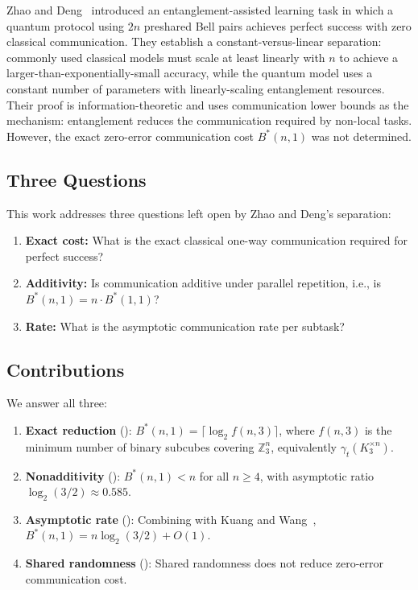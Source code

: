 \documentclass[11pt,letterpaper]{article}
\newcommand{\Z}{\mathbb{Z}}
\newcommand{\gammat}{\gamma_t}
\newcommand{\Bstar}{B^{\!*}}
\begin{document}
Zhao and Deng~\cite{zhaodeng2025} introduced an entanglement-assisted learning task in which a quantum protocol using $2n$ preshared Bell pairs achieves perfect success with zero classical communication. They establish a constant-versus-linear separation: commonly used classical models must scale at least linearly with $n$ to achieve a larger-than-exponentially-small accuracy, while the quantum model uses a constant number of parameters with linearly-scaling entanglement resources. Their proof is information-theoretic and uses communication lower bounds as the mechanism: entanglement reduces the communication required by non-local tasks. However, the exact zero-error communication cost $\Bstar(n,1)$ was not determined.

\subsection{Three Questions}

This work addresses three questions left open by Zhao and Deng's separation:
\begin{enumerate}[leftmargin=*,itemsep=2pt]
  \item \textbf{Exact cost:} What is the exact classical one-way communication required for perfect success?
  \item \textbf{Additivity:} Is communication additive under parallel repetition, i.e., is $\Bstar(n,1) = n \cdot \Bstar(1,1)$?
  \item \textbf{Rate:} What is the asymptotic communication rate per subtask?
\end{enumerate}

\subsection{Contributions}

We answer all three:
\begin{enumerate}[leftmargin=*,itemsep=2pt]
  \item \textbf{Exact reduction} (): $\Bstar(n,1) = \lceil \log_2 f(n,3) \rceil$, where $f(n,3)$ is the minimum number of binary subcubes covering $\Z_3^n$, equivalently $\gammat(K_3^{\times n})$.
  \item \textbf{Nonadditivity} (): $\Bstar(n,1) < n$ for all $n \geq 4$, with asymptotic ratio $\log_2(3/2) \approx 0.585$.
  \item \textbf{Asymptotic rate} (): Combining with Kuang and Wang~\cite{kuangwang2026}, $\Bstar(n,1) = n\log_2(3/2) + O(1)$.
  \item \textbf{Shared randomness} (): Shared randomness does not reduce zero-error communication cost.
\end{enumerate}
\end{document}
